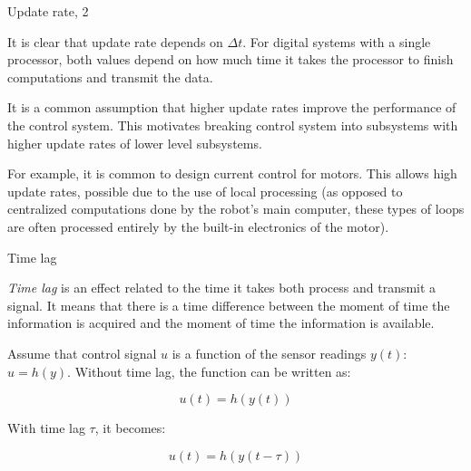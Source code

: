 \documentclass{beamer}
\begin{document}
\begin{frame}{Update rate, 2}
	\begin{flushleft}
		
		It is clear that update rate depends on $\Delta t$. For digital systems with a single processor, both values depend on how much time it takes the processor to finish computations and transmit the data.
		
		\bigskip
		
		It is a common assumption that higher update rates improve the performance of the control system. This motivates breaking control system into subsystems with higher update rates of lower level subsystems. 
		
		\bigskip
		
		For example, it is common to design current control for motors. This allows high update rates, possible due to the use of local processing (as opposed to centralized computations done by the robot's main computer, these types of loops are often processed entirely by the built-in electronics of the motor).
		
	\end{flushleft}
\end{frame}



\begin{frame}{Time lag}
	\begin{flushleft}
		
		\emph{Time lag} is an effect related to the time it takes both process and transmit a signal. It means that there is a time difference between the moment of time the information is acquired and the moment of time the information is available.
		
		\bigskip
		
		 Assume that control signal $u$ is a function of the sensor readings $y(t)$: $u = h(y)$. Without time lag, the function can be written as:
		 
		 \begin{equation}
		 	u(t) = h(y(t))
		 \end{equation}
		
			With time lag $\tau$, it becomes:
			
			\begin{equation}
				u(t) = h(y(t-\tau))
			\end{equation}
			
	\end{flushleft}
\end{frame}
\end{document}
